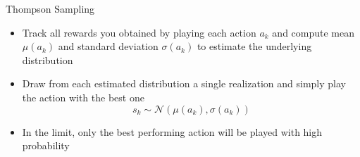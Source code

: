\begin{frame}[c]{Thompson Sampling}
	
	\begin{itemize}
		\item Track all rewards you obtained by playing each action $a_k$ and compute mean $\mu(a_k)$ and standard deviation $\sigma(a_k)$ to estimate the underlying distribution
		\item Draw from each estimated distribution a single realization and simply play the action with the best one
		$$ s_k \sim \mathcal{N}(\mu(a_k), \sigma(a_k))$$
		\item In the limit, only the best performing action will be played with high probability
	\end{itemize}
	
\end{frame}

